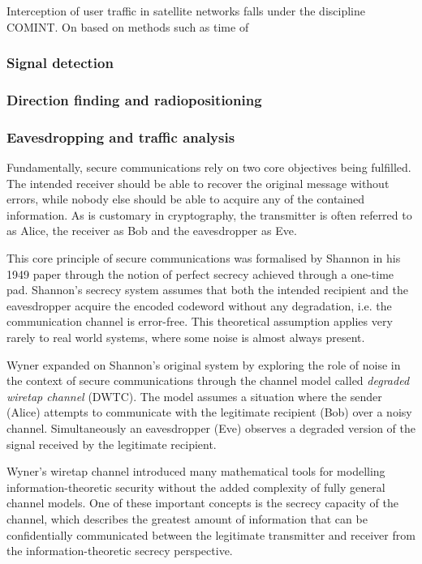 \documentclass[english, 12pt, a4paper, elec, utf8, a-1b, online]{aaltothesis}
\begin{document}
Interception of user traffic in satellite networks falls under the discipline COMINT. On  based on methods such as time of 

\subsubsection{Signal detection}
\subsubsection{Direction finding and radiopositioning}
\subsubsection{Eavesdropping and traffic analysis}
Fundamentally, secure communications rely on two core objectives being fulfilled. The intended receiver should be able to recover the original message without errors, while nobody else should be able to acquire any of the contained information. As is customary in cryptography, the transmitter is often referred to as Alice, the receiver as Bob and the eavesdropper as Eve. \cite{bloch2011physical}

This core principle of secure communications was formalised by Shannon \cite{shannon1949communication} in his 1949 paper through the notion of perfect secrecy achieved through a one-time pad. Shannon’s secrecy system assumes that both the intended recipient and the eavesdropper acquire the encoded codeword without any degradation, i.e. the communication channel is error-free. This theoretical assumption applies very rarely to real world systems, where some noise is almost always present. \cite{bloch2011physical}

Wyner \cite{wyner1975thewiretap} expanded on Shannon’s original system by exploring the role of noise in the context of secure communications through the channel model called \textit{degraded wiretap channel} (DWTC). The model assumes a situation where the sender (Alice) attempts to communicate with the legitimate recipient (Bob) over a noisy channel. Simultaneously an eavesdropper (Eve) observes a degraded version of the signal received by the legitimate recipient. \cite{barros2006secrecy}

Wyner’s wiretap channel introduced many mathematical tools for modelling information-theoretic security without the added complexity of fully general channel models. One of these important concepts is the secrecy capacity of the channel, which describes the greatest amount of information that can be confidentially communicated between the legitimate transmitter and receiver from the information-theoretic secrecy perspective. \cite{bloch2011physical}
\end{document}
